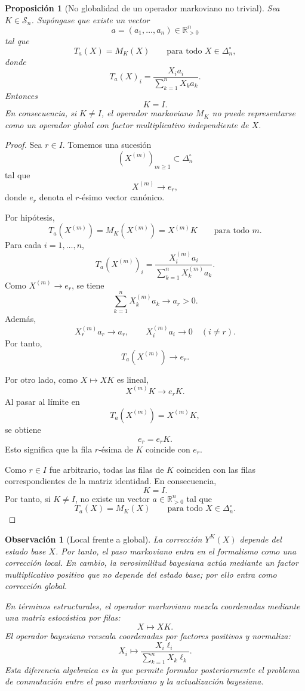 ﻿\documentclass[12pt]{article}
\newtheorem{proposicion}{Proposición}[section]
\newtheorem{observacion}{Observación}[section]
\begin{document}
\begin{proposicion}[No globalidad de un operador markoviano no trivial]\label{prop:markov_no_global}
Sea \(K\in\mathcal S_n\). Supóngase que existe un vector
\[
a=(a_1,\dots,a_n)\in\mathbb R_{>0}^n
\]
tal que
\[
T_a(X)=M_K(X)
\qquad
\text{para todo }X\in\Delta_n^\circ,
\]
donde
\[
T_a(X)_i
=
\frac{X_i a_i}{\sum_{k=1}^n X_k a_k}.
\]
Entonces
\[
K=I.
\]
En consecuencia, si \(K\neq I\), el operador markoviano \(M_K\) no puede representarse como un operador global con factor multiplicativo independiente de \(X\).
\end{proposicion}

\begin{proof}
Sea \(r\in I\). Tomemos una sucesión
\[
(X^{(m)})_{m\ge1}\subset\Delta_n^\circ
\]
tal que
\[
X^{(m)}\to e_r,
\]
donde \(e_r\) denota el \(r\)-ésimo vector canónico.

Por hipótesis,
\[
T_a(X^{(m)})=M_K(X^{(m)})=X^{(m)}K
\qquad
\text{para todo }m.
\]
Para cada \(i=1,\dots,n\),
\[
T_a(X^{(m)})_i
=
\frac{X_i^{(m)}a_i}{\sum_{k=1}^nX_k^{(m)}a_k}.
\]
Como \(X^{(m)}\to e_r\), se tiene
\[
\sum_{k=1}^nX_k^{(m)}a_k\to a_r>0.
\]
Además,
\[
X_r^{(m)}a_r\to a_r,
\qquad
X_i^{(m)}a_i\to 0
\quad (i\neq r).
\]
Por tanto,
\[
T_a(X^{(m)})\to e_r.
\]

Por otro lado, como \(X\mapsto XK\) es lineal,
\[
X^{(m)}K\to e_rK.
\]
Al pasar al límite en
\[
T_a(X^{(m)})=X^{(m)}K,
\]
se obtiene
\[
e_r=e_rK.
\]
Esto significa que la fila \(r\)-ésima de \(K\) coincide con \(e_r\).

Como \(r\in I\) fue arbitrario, todas las filas de \(K\) coinciden con las filas correspondientes de la matriz identidad. En consecuencia,
\[
K=I.
\]
Por tanto, si \(K\neq I\), no existe un vector \(a\in\mathbb R_{>0}^n\) tal que
\[
T_a(X)=M_K(X)
\qquad
\text{para todo }X\in\Delta_n^\circ.
\]
\end{proof}

\begin{observacion}[Local frente a global]\label{obs:local_vs_global}
La corrección \(Y^K(X)\) depende del estado base \(X\). Por tanto, el paso markoviano entra en el formalismo como una corrección local. En cambio, la verosimilitud bayesiana actúa mediante un factor multiplicativo positivo que no depende del estado base; por ello entra como corrección global.

En términos estructurales, el operador markoviano mezcla coordenadas mediante una matriz estocástica por filas:
\[
X\longmapsto XK.
\]
El operador bayesiano reescala coordenadas por factores positivos y normaliza:
\[
X_i\longmapsto
\frac{X_i\ell_i}{\sum_{k=1}^n X_k\ell_k}.
\]
Esta diferencia algebraica es la que permite formular posteriormente el problema de conmutación entre el paso markoviano y la actualización bayesiana.
\end{observacion}
\end{document}
